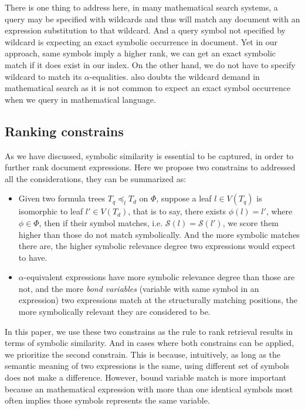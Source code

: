 There is one thing to address here, in many mathematical search systems, a query may be specified with wildcards and thus will match any document with an expression substitution to that wildcard. 
And a query symbol not specified by wildcard is expecting an exact symbolic occurrence in document.
Yet in our approach, same symbols imply a higher rank, we can get an exact symbolic match if it does exist in our index. 
On the other hand, we do not have to specify wildcard to match its $\alpha$-equalities.
\cite{mias11a} also doubts the wildcard demand in mathematical search as it is not common to expect an exact symbol occurrence when we query in mathematical language.

\subsection{Ranking constrains}
As we have discussed, symbolic similarity is essential to be captured, in order to further rank document expressions. 
Here we propose two constrains to addressed all the considerations, they can be summarized as:

\begin{itemize}
\item Given two formula trees
$T_q \preceq_l T_d$ on $\Phi$,  
suppose a leaf $l \in V(T_q)$ is isomorphic to leaf $l' \in V(T_d)$, that is to say, there exists $\phi(l)=l'$, where $\phi \in \Phi$, then if their symbol matches, i.e. $\mathcal{S}(l) = \mathcal{S}(l')$, we score them higher than those do not match symbolically. And the more symbolic matches there are, the higher symbolic relevance degree two expressions would expect to have.
\item $\alpha$-equivalent expressions have more symbolic relevance degree than those are not, and the more \textit{bond variables} (variable with same symbol in an expression) two expressions match at the structurally matching positions, the more symbolically relevant they are considered to be.
\end{itemize}

In this paper, we use these two constrains as the rule to rank retrieval results in terms of symbolic similarity.
And in cases where both constrains can be applied, we prioritize the second constrain. 
This is because, intuitively, as long as the semantic meaning of two expressions is the same, using different set of symbols does not make a difference. 
However, bound variable match is more important because an mathematical expression with more than one identical symbols most often implies those symbols represents the same variable. 

